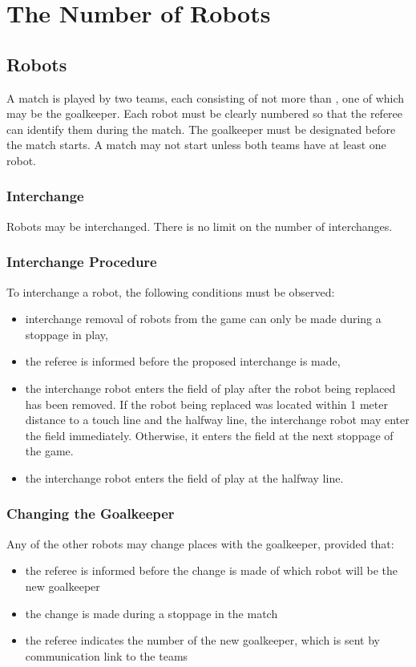 \section{The Number of Robots}\label{sec:number-of-robots}

\subsection{Robots}
A match is played by two teams, each consisting of not more than  , one of which may be the goalkeeper.
Each robot must be clearly numbered so that the referee can identify them during the match.
The goalkeeper must be designated before the match starts.
A match may not start unless both teams have at least one robot.

\subsubsection{Interchange}\label{subsubsec:number-of-robots-interchange}
Robots may be interchanged.
There is no limit on the number of interchanges.

\subsubsection{Interchange Procedure}
To interchange a robot, the following conditions must be observed:
\begin{itemize}
\item interchange removal of robots from the game can only be made during a stoppage in play,
\item the referee is informed before the proposed interchange is made,
\item the interchange robot enters the field of play after the robot being replaced has been removed.
If the robot being replaced was located within 1 meter distance to a touch line and the halfway line, the interchange robot may enter the field immediately. Otherwise, it enters the field at the next stoppage of the game.
\item the interchange robot enters the field of play at the halfway line.
\end{itemize}

\subsubsection{Changing the Goalkeeper}
Any of the other robots may change places with the goalkeeper, provided that:
\begin{itemize}
\item the referee is informed before the change is made of which robot will be the new goalkeeper
\item the change is made during a stoppage in the match
\item the referee indicates the number of the new goalkeeper, which is sent by communication link to the teams
\end{itemize}

